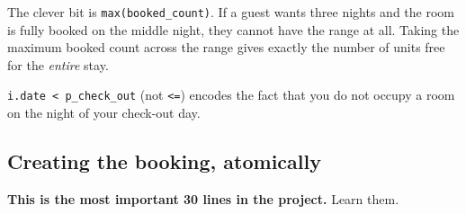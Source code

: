 \documentclass[11pt,a4paper]{article}
\begin{document}
The clever bit is \texttt{max(booked\_count)}. If a guest wants three nights and
the room is fully booked on the middle night, they cannot have the range at all.
Taking the maximum booked count across the range gives exactly the number of
units free for the \emph{entire} stay.

\texttt{i.date < p\_check\_out} (not \texttt{<=}) encodes the fact that you do not
occupy a room on the night of your check-out day.

\subsection{Creating the booking, atomically}
\label{sec:concurrency}

\textbf{This is the most important 30 lines in the project.} Learn them.
\end{document}
